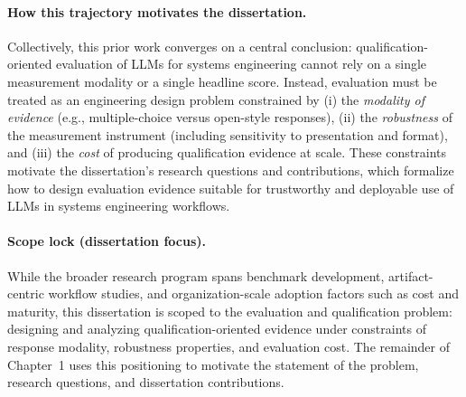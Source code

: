 \paragraph{How this trajectory motivates the dissertation.}
Collectively, this prior work converges on a central conclusion: qualification-oriented evaluation of LLMs for systems engineering cannot rely on a single measurement modality or a single headline score. Instead, evaluation must be treated as an engineering design problem constrained by (i) the \emph{modality of evidence} (e.g., multiple-choice versus open-style responses), (ii) the \emph{robustness} of the measurement instrument (including sensitivity to presentation and format), and (iii) the \emph{cost} of producing qualification evidence at scale. These constraints motivate the dissertation's research questions and contributions, which formalize how to design evaluation evidence suitable for trustworthy and deployable use of LLMs in systems engineering workflows.

\paragraph{Scope lock (dissertation focus).}
While the broader research program spans benchmark development, artifact-centric workflow studies, and organization-scale adoption factors such as cost and maturity, this dissertation is scoped to the evaluation and qualification problem: designing and analyzing qualification-oriented evidence under constraints of response modality, robustness properties, and evaluation cost. The remainder of Chapter~1 uses this positioning to motivate the statement of the problem, research questions, and dissertation contributions.
